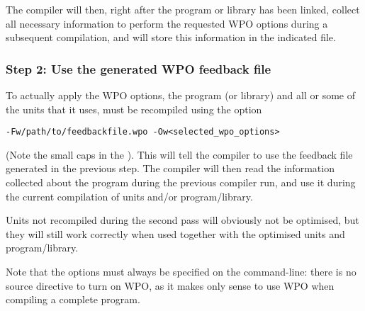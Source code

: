 The compiler will then, right after the program or library has been linked, 
collect all necessary information to perform the requested WPO options during 
a subsequent compilation, and will store this information in the indicated
file.

\subsubsection{Step 2: Use the generated WPO feedback file}
To actually apply the WPO options, the program (or library) and all or some 
of the units that it uses, must be recompiled using the option
\begin{verbatim}
-Fw/path/to/feedbackfile.wpo -Ow<selected_wpo_options>
\end{verbatim}
(Note the small caps in the ). This will tell the compiler to use 
the feedback file generated in the previous step. The compiler will then 
read the information collected about the program during the previous compiler 
run, and use it during the current compilation of units and/or program/library. 

Units not recompiled during the second pass will obviously not be optimised,
but they will still work correctly when used together with the optimised
units and program/library.

\begin{remark}
Note that the options must always be specified on the command-line: there is
no source directive to turn on WPO, as it makes only sense to use WPO when
compiling a complete program.
\end{remark}

